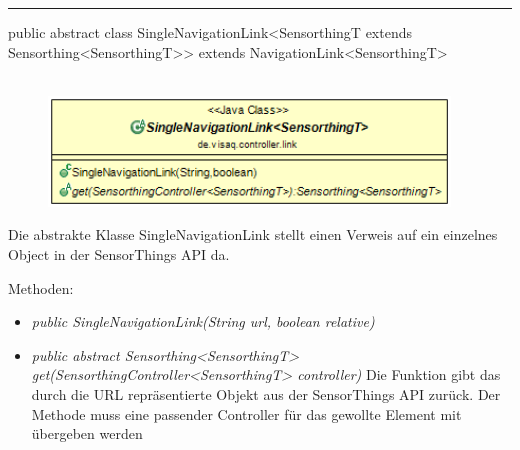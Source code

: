 \rule{\textwidth}{0.4pt}
public abstract class SingleNavigationLink<SensorthingT extends Sensorthing<SensorthingT>> extends NavigationLink<SensorthingT>
\\\\
\begin{minipage}{0.55\textwidth}
    \begin{figure}[H]
        {\centering\includegraphics[width=0.95\textwidth]{media/backend/controller/classes/SingleNavigationLink.png}}
    \end{figure}
    \end{minipage} \hfill
\begin{minipage}{0.45\textwidth}
    Die abstrakte Klasse SingleNavigationLink stellt einen Verweis auf ein einzelnes Object in der \gls{SensorThings API} da.
\end{minipage}

Methoden:
\begin{itemize}
    \item \emph{public SingleNavigationLink(String url, boolean relative)}
    \relativeDescription
    \item \emph{public abstract Sensorthing<SensorthingT> get(SensorthingController<SensorthingT> controller)}
    Die Funktion gibt das durch die URL repräsentierte Objekt aus der \gls{SensorThings API} zurück.
    Der Methode muss eine passender Controller für das gewollte Element mit übergeben werden
\end{itemize}

